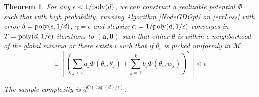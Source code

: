 \documentclass{article}
\newtheorem{theorem}{Theorem}[section]
\DeclareMathOperator*{\expt}{\mathbb{E}}
\begin{document}
\begin{theorem}
For any $\epsilon < 1/\mathrm{poly}(d)$, we can construct a realizable potential $\Phi$ such that with high probability, running Algorithm \ref{NodeGDOpt} on \eqref{errLoss} with error $\delta = \mathrm{poly}(\epsilon,1/d)$, $\gamma = \epsilon$ and stepsize $\alpha = 1/\mathrm{poly}(d,1/\epsilon)$ converges in $T = \mathrm{poly}(d, 1/\epsilon)$ iterations to $(\boldsymbol{a,\theta})$ such that either  $\theta$ is within $\epsilon$-neighborhood of the global minima or there exists $i$ such that if $\theta_i$ is picked uniformly in $\mathcal{M}$
%
\[ \expt\left[\left( \sum_{j < i} a_j \Phi(\theta_i,\theta_j) + \sum_{j=1}^k b_j \Phi(\theta_i,w_j)\right)^2\right] < \epsilon\]

The sample complexity is $d^{O(\log(d)/\epsilon)}$.
\end{theorem}
\end{document}
